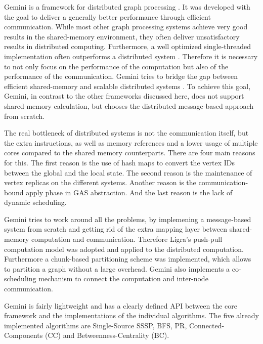 
Gemini is a framework for distributed graph processing \cite{Gemini}.
It was developed with the goal to deliver a generally better performance through efficient communication.
While most other graph processing systems achieve very good results in the shared-memory environment, they often deliver unsatisfactory results in distributed computing.
Furthermore, a well optimized single-threaded implementation often outperforms a distributed system \cite{scalability}.
Therefore it is necessary to not only focus on the performance of the computation but also of the performance of the communication.
Gemini tries to bridge the gap between efficient shared-memory and scalable distributed systems \cite{Gemini}.
To achieve this goal, Gemini, in contrast to the other frameworks discussed here, does not support shared-memory calculation, but chooses the distributed message-based approach from scratch.

The real bottleneck of distributed systems is not the communication itself, but the extra instructions, as well as memory references and a lower usage of multiple cores compared to the shared memory counterparts.
There are four main reasons for this.
The first reason is the use of hash maps to convert the vertex IDs between the global and the local state.
The second reason is the maintenance of vertex replicas on the different systems.
Another reason is the communication-bound apply phase in GAS abstraction.
And the last reason is the lack of dynamic scheduling.

Gemini tries to work around all the problems, by implemening a message-based system from scratch and getting rid of the extra mapping layer between shared-memory computation and communication.
Therefore Ligra's push-pull computation model was adopted and applied to the distributed computation.
Furthermore a chunk-based partitioning scheme was implemented, which allows to partition a graph without a large overhead.
Gemini also implements a co-scheduling mechanism to connect the computation and inter-node communication.

Gemini is fairly lightweight and has a clearly defined API between the core framework and the implementations of the individual algorithms. The five already implemented algorithms are Single-Source SSSP, BFS, PR, Connected-Components (CC) and Betweenness-Centrality (BC).

